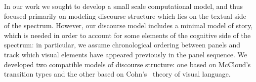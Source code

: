 In our work we sought to develop a small scale computational model, and thus
focused primarily on modeling discourse structure which lies on the textual
side of the spectrum. However, our discourse model includes a minimal model of
story, which is needed in order to account for some elements of the cognitive
side of the spectrum: in particular, we assume chronological ordering
between panels and track which visual elements have appeared previously in the
panel sequence.  We developed two compatible models of discourse
structure: one based on McCloud's transition types and the other based on
Cohn's~\cite{cohn2013visual} theory of visual language.



